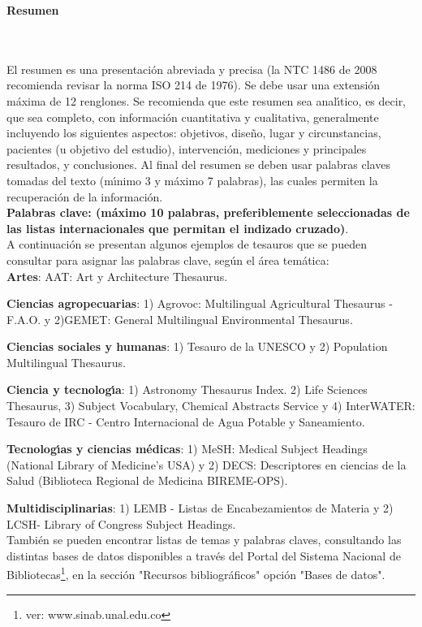 \newpage
\textbf{\LARGE Resumen}
\\\\
El resumen es una presentaci\'{o}n abreviada y precisa (la NTC 1486 de 2008 recomienda revisar la norma ISO 214 de 1976). Se debe usar una extensi\'{o}n m\'{a}xima de 12 renglones. Se recomienda que este resumen sea anal\'{\i}tico, es decir, que sea completo, con informaci\'{o}n cuantitativa y cualitativa, generalmente incluyendo los siguientes aspectos: objetivos, dise\~{n}o, lugar y circunstancias, pacientes (u objetivo del estudio), intervenci\'{o}n, mediciones y principales resultados, y conclusiones. Al final del resumen se deben usar palabras claves tomadas del texto (m\'{\i}nimo 3 y m\'{a}ximo 7 palabras), las cuales permiten la recuperaci\'{o}n de la informaci\'{o}n.\\

\textbf{\small Palabras clave: (m\'{a}ximo 10 palabras, preferiblemente seleccionadas de las listas internacionales que permitan el indizado cruzado)}.\\

A continuaci\'{o}n se presentan algunos ejemplos de tesauros que se pueden consultar para asignar las palabras clave, seg\'{u}n el \'{a}rea tem\'{a}tica:\\

\textbf{Artes}: AAT: Art y Architecture Thesaurus.

\textbf{Ciencias agropecuarias}: 1) Agrovoc: Multilingual Agricultural Thesaurus - F.A.O. y 2)GEMET: General Multilingual Environmental Thesaurus.

\textbf{Ciencias sociales y humanas}: 1) Tesauro de la UNESCO y 2) Population Multilingual Thesaurus.

\textbf{Ciencia y tecnolog\'{\i}a}: 1) Astronomy Thesaurus Index. 2) Life Sciences Thesaurus, 3) Subject Vocabulary, Chemical Abstracts Service y 4) InterWATER: Tesauro de IRC - Centro Internacional de Agua Potable y Saneamiento.

\textbf{Tecnolog\'{\i}as y ciencias m\'{e}dicas}: 1) MeSH: Medical Subject Headings (National Library of Medicine's USA) y 2) DECS: Descriptores en ciencias de la Salud (Biblioteca Regional de Medicina BIREME-OPS).

\textbf{Multidisciplinarias}: 1) LEMB - Listas de Encabezamientos de Materia y 2) LCSH- Library of Congress Subject Headings.\\

Tambi\'{e}n se pueden encontrar listas de temas y palabras claves, consultando las distintas bases de datos disponibles a trav\'{e}s del Portal del Sistema Nacional de Bibliotecas\footnote{ver: www.sinab.unal.edu.co}, en la secci\'{o}n "Recursos bibliogr\'{a}ficos" opci\'{o}n "Bases de datos".\\

